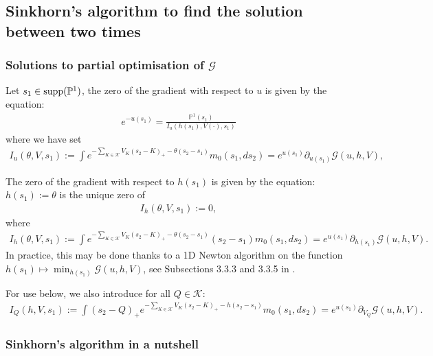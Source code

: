 \documentclass{amsart}%
\def \P{{\mathbb P}}
\def\Gc{{\cal G}}
\def\no{\noindent}
\theoremstyle{definition}
\theoremstyle{remark}
\newcommand{\PP}{\mathbb{P}}
\newcommand{\bea}{\begin{eqnarray}}
\newcommand{\eea}{\end{eqnarray}}
\newcommand{\beaa}{\begin{eqnarray*}}
\newcommand{\eeaa}{\end{eqnarray*}}
\newcommand{\cal}{\mathcal}
\begin{document}
\subsection{Sinkhorn's algorithm to find the solution between two times}

\subsubsection{Solutions to partial optimisation of $\Gc$}

\no Let $s_1\in {\rm supp}(\P^1)$, the zero of the gradient with respect to $u$ is given by the equation:
\bea
e^{-u(s_1)}=\frac{\PP^1(s_1) }{I_u(h(s_1),V(\cdot),s_1)} \label{u1} \eea
where we have set
\beaa
I_u(\theta,V,s_1):=\int e^{- \sum_{K \in {\cal K}} V_K (s_{2}-K)_+-\theta(s_2-s_1)} m_0(s_1,ds_2) = e^{u(s_1)}\partial_{u(s_1)}\Gc(u,h,V),  \label{I_u}
\eeaa


\no The zero of the gradient with respect to $h(s_1)$ is given by the equation:  $h(s_1):=\theta$ is the unique zero of
\bea
I_h( \theta,V,s_1):=0, \label{h}
\eea
where
\beaa
I_h(\theta,V,s_1):=\int e^{- \sum_{K \in {\cal K}} V_K (s_{2}-K)_+ -\theta(s_2-s_1)} (s_2-s_1){m_0}(s_1,ds_2) = e^{u(s_1)}\partial_{h(s_1)}\Gc(u,h,V).   \label{I_h}
\eeaa
In practice, this may be done thanks to a 1D Newton algorithm on the function $h(s_1)\mapsto \min_{h(s_1)}\Gc(u,h,V)$, see Subsections 3.3.3 and 3.3.5 in \cite{de2018entropic}.


\no For use below, we also introduce  for all $Q \in {\cal K}$:
\beaa I_Q(h,V,s_1):=\int (s_2-Q)_+ e^{- \sum_{K \in {\cal K}} V_K (s_{2}-K)_+ -h(s_2-s_1)} {m_0}(s_1,ds_2)  = e^{u(s_1)}\partial_{V_Q}\Gc(u,h,V).
\eeaa

\subsubsection{Sinkhorn's algorithm in a nutshell}
\end{document}
